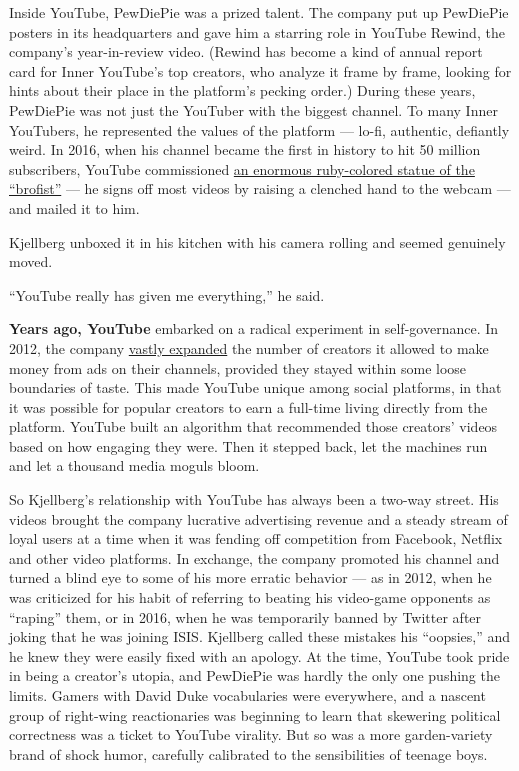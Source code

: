 Inside YouTube, PewDiePie was a prized talent. The company put up
PewDiePie posters in its headquarters and gave him a starring role in
YouTube Rewind, the company's year-in-review video. (Rewind has become a
kind of annual report card for Inner YouTube's top creators, who analyze
it frame by frame, looking for hints about their place in the platform's
pecking order.) During these years, PewDiePie was not just the YouTuber
with the biggest channel. To many Inner YouTubers, he represented the
values of the platform --- lo-fi, authentic, defiantly weird. In 2016,
when his channel became the first in history to hit 50 million
subscribers, YouTube commissioned
\href{https://www.youtube.com/watch?v=7Vj5M0qKh8g}{an enormous
ruby-colored statue of the ``brofist''} --- he signs off most videos by
raising a clenched hand to the webcam --- and mailed it to him.

Kjellberg unboxed it in his kitchen with his camera rolling and seemed
genuinely moved.

``YouTube really has given me everything,'' he said.

\textbf{Years ago, YouTube} embarked on a radical experiment in
self-governance. In 2012, the company
\href{https://www.theverge.com/2012/4/13/2945243/youtube-partner-program-monetization}{vastly
expanded} the number of creators it allowed to make money from ads on
their channels, provided they stayed within some loose boundaries of
taste. This made YouTube unique among social platforms, in that it was
possible for popular creators to earn a full-time living directly from
the platform. YouTube built an algorithm that recommended those
creators' videos based on how engaging they were. Then it stepped back,
let the machines run and let a thousand media moguls bloom.

So Kjellberg's relationship with YouTube has always been a two-way
street. His videos brought the company lucrative advertising revenue and
a steady stream of loyal users at a time when it was fending off
competition from Facebook, Netflix and other video platforms. In
exchange, the company promoted his channel and turned a blind eye to
some of his more erratic behavior --- as in 2012, when he was criticized
for his habit of referring to beating his video-game opponents as
``raping'' them, or in 2016, when he was temporarily banned by Twitter
after joking that he was joining ISIS. Kjellberg called these mistakes
his ``oopsies,'' and he knew they were easily fixed with an apology. At
the time, YouTube took pride in being a creator's utopia, and PewDiePie
was hardly the only one pushing the limits. Gamers with David Duke
vocabularies were everywhere, and a nascent group of right-wing
reactionaries was beginning to learn that skewering political
correctness was a ticket to YouTube virality. But so was a more
garden-variety brand of shock humor, carefully calibrated to the
sensibilities of teenage boys.

